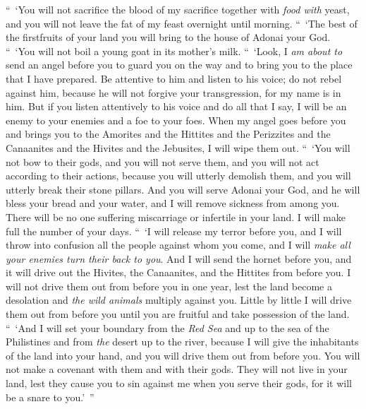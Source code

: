 \begin{biblechapter}
\verse “ ‘You will not sacrifice the blood of my sacrifice together with \textit{food with} yeast, and you will not leave the fat of my feast overnight until morning.
\verse “ ‘The best of the firstfruits of your land you will bring to the house of Adonai your God. “ ‘You will not boil a young goat in its mother’s milk.
 “ ‘Look, I \textit{am about to} send an angel before you to guard you on the way and to bring you to the place that I have prepared.
\verse Be attentive to him and listen to his voice; do not rebel against him, because he will not forgive your transgression, for my name is in him.
\verse But if you listen attentively to his voice and do all that I say, I will be an enemy to your enemies and a foe to your foes.
\verse When my angel goes before you and brings you to the Amorites and the Hittites and the Perizzites and the Canaanites and the Hivites and the Jebusites, I will wipe them out.
\verse “ ‘You will not bow to their gods, and you will not serve them, and you will not act according to their actions, because you will utterly demolish them, and you will utterly break their stone pillars.
\verse And you will serve Adonai your God, and he will bless your bread and your water, and I will remove sickness from among you.
\verse There will be no one suffering miscarriage or infertile in your land. I will make full the number of your days.
\verse “ ‘I will release my terror before you, and I will throw into confusion all the people against whom you come, and I will \textit{make all your enemies turn their back to you}.
\verse And I will send the hornet before you, and it will drive out the Hivites, the Canaanites, and the Hittites from before you.
\verse I will not drive them out from before you in one year, lest the land become a desolation and \textit{the wild animals} multiply against you.
\verse Little by little I will drive them out from before you until you are fruitful and take possession of the land.
\verse “ ‘And I will set your boundary from the \textit{Red Sea} and up to the sea of the Philistines and from \textit{the} desert up to the river, because I will give the inhabitants of the land into your hand, and you will drive them out from before you.
\verse You will not make a covenant with them and with their gods.
\verse They will not live in your land, lest they cause you to sin against me when you serve their gods, for it will be a snare to you.’ ”
\end{biblechapter}

